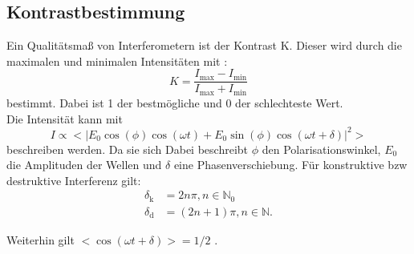 \subsection{Kontrastbestimmung}
Ein Qualitätsmaß von Interferometern ist der Kontrast K. Dieser wird durch die maximalen
und minimalen Intensitäten mit :
\begin{equation}
	K= \frac{I_{\text{max}}-I_{\text{min}}}{I_{\text{max}}+I_{\text{min}}}
	\label{eq:Kontrast}
\end{equation}
bestimmt. Dabei ist 1 der bestmögliche und 0 der schlechteste Wert. \\
Die Intensität kann mit
\begin{equation}
	I \propto <|E_0 \cos{(\phi)}\cos{(\omega t)} + E_0 \sin{(\phi)}\cos{(\omega t + \delta)} |^2>
\end{equation}
beschreiben werden. Da sie sich  Dabei beschreibt $\phi$ den Polarisationswinkel, $E_0$ die
Amplituden der Wellen und $\delta$ eine Phasenverschiebung.
Für konstruktive bzw destruktive Interferenz gilt:
\begin{align}
	\delta_{\text{k}}&=2 n \pi , n \in \mathds{N}_0 \\
	\delta_{\text{d}}&=(2n+1)\pi , n \in \mathds{N} .
\end{align}

Weiterhin gilt $<\cos(\omega t + \delta)>=1/2$ .

